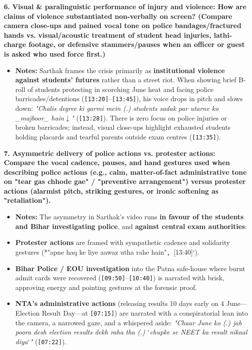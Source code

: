 \documentclass[10pt,a4paper]{article}
\begin{document}
\noindent\textbf{6.} \textbf{Visual \& paralinguistic performance of injury and violence: How are claims of violence substantiated non-verbally on screen? (Compare camera close-ups and pained vocal tone on police bandages/fractured hands vs. visual/acoustic treatment of student head injuries, lathi-charge footage, or defensive stammers/pauses when an officer or guest is asked who used force first.)}\par\smallskip
\begin{itemize}
  \item \textbf{Notes:}
Sarthak frames the crisis primarily as \textbf{institutional violence against students' futures} rather than a street riot. When showing brief B-roll of students protesting in scorching June heat and facing police barricades/detentions (\texttt{[13:20]}--\texttt{[13:45]}), his voice drops in pitch and slows down: \textit{"Chalis degree ki garmi mein (.) students sadak par utarne ko \_majboor\_ hain$\downarrow$"} (\texttt{[13:28]}). There is zero focus on police injuries or broken barricades; instead, visual close-ups highlight exhausted students holding placards and tearful parents outside exam centres (\texttt{[13:35]}).\par\smallskip
\end{itemize}

\noindent\textbf{7.} \textbf{Asymmetric delivery of police actions vs. protester actions: Compare the vocal cadence, pauses, and hand gestures used when describing police actions (e.g., calm, matter-of-fact administrative tone on "tear gas chhode gae" / "preventive arrangement") versus protester actions (alarmist pitch, striking gestures, or ironic softening as "retaliation").}\par\smallskip
\begin{itemize}
  \item \textbf{Notes:}
The asymmetry in Sarthak's video runs \textbf{in favour of the students and Bihar investigating police}, and \textbf{against central exam authorities}:\par\smallskip
  \item \textbf{Protester actions} are framed with sympathetic cadence and solidarity gestures (*"apne haq ke liye aawaz utha rahe hain"\texttt{, }[13:40]`).
  \item \textbf{Bihar Police / EOU investigation} into the Patna safe-house where burnt admit cards were recovered (\texttt{[09:50]}--\texttt{[10:40]}) is narrated with brisk, approving energy and pointing gestures at the forensic proof.
  \item \textbf{NTA's administrative actions} (releasing results 10 days early on 4 June---Election Result Day---at \texttt{[07:15]}) are narrated with a conspiratorial lean into the camera, a narrowed gaze, and a whispered aside: \textit{"Chaar June ko (.) jab poora desh election results dekh raha tha (.) $^\circ$chupke se NEET ka result nikaal diya$^\circ$"} (\texttt{[07:22]}).
\end{itemize}
\end{document}
